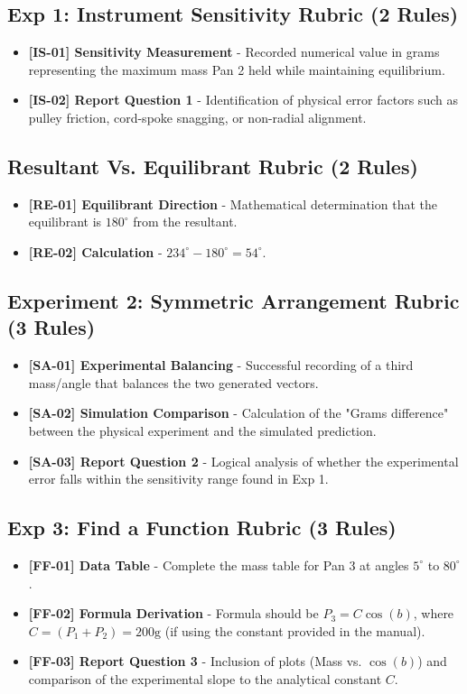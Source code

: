 \documentclass{article}
\begin{document}
\subsection*{ Exp 1: Instrument Sensitivity Rubric (2 Rules) }
\begin{itemize}
\item \textbf{ [IS-01] Sensitivity Measurement } - Recorded numerical value in grams representing the maximum mass Pan 2 held while maintaining equilibrium.
\item \textbf{ [IS-02] Report Question 1 } - Identification of physical error factors such as pulley friction, cord-spoke snagging, or non-radial alignment.
\end{itemize}

\subsection*{ Resultant Vs. Equilibrant Rubric (2 Rules) }
\begin{itemize}
\item \textbf{ [RE-01] Equilibrant Direction } - Mathematical determination that the equilibrant is $180^\circ$ from the resultant.
\item \textbf{ [RE-02] Calculation } - $234^\circ - 180^\circ = 54^\circ$.
\end{itemize}

\subsection*{ Experiment 2: Symmetric Arrangement Rubric (3 Rules) }
\begin{itemize}
\item \textbf{ [SA-01] Experimental Balancing } - Successful recording of a third mass/angle that balances the two generated vectors.
\item \textbf{ [SA-02] Simulation Comparison } - Calculation of the "Grams difference" between the physical experiment and the simulated prediction.
\item \textbf{ [SA-03] Report Question 2 } - Logical analysis of whether the experimental error falls within the sensitivity range found in Exp 1.
\end{itemize}

\subsection*{ Exp 3: Find a Function Rubric (3 Rules) }
\begin{itemize}
\item \textbf{ [FF-01] Data Table } - Complete the mass table for Pan 3 at angles $5^\circ$ to $80^\circ$.
\item \textbf{ [FF-02] Formula Derivation } - Formula should be $P_3 = C \cos(b)$, where $C = (P_1 + P_2) = 200\text{g}$ (if using the constant provided in the manual).
\item \textbf{ [FF-03] Report Question 3 } - Inclusion of plots (Mass vs. $\cos(b)$) and comparison of the experimental slope to the analytical constant $C$.
\end{itemize}
\end{document}
